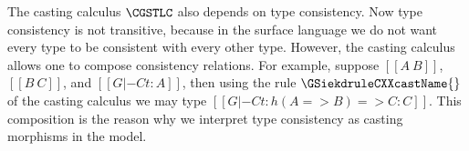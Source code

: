The casting calculus $\CGSTLC$ also depends on type consistency.  Now
type consistency is not transitive, because in the surface language we
do not want every type to be consistent with every other type.
However, the casting calculus allows one to compose consistency
relations.  For example, suppose $[[A ~ B]]$, $[[B ~ C]]$, and $[[G |-C
    t : A]]$, then using the rule $\GSiekdruleCXXcastName{}$ of the
casting calculus we may type $[[G |-C t : h({A} => {B}) => {C} : C]]$.  This composition
is the reason why we interpret type consistency as casting morphisms
in the model.

